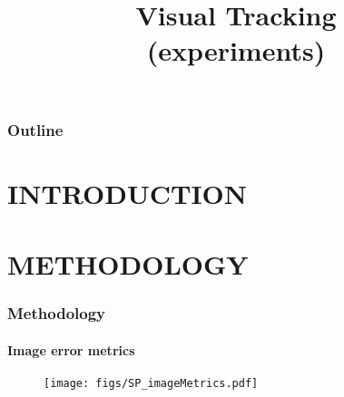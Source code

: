 
\title{Visual Tracking \\ (experiments)}
\begin{frame}[plain]\logoTechTower
	\titlepage
\end{frame}

\begin{frame}
\frametitle{Outline}
\logoCSIPCPL\logoTechTower
	\setcounter{tocdepth}{1}	
	\tableofcontents
\end{frame}

\section{INTRODUCTION}


\section{METHODOLOGY}









\begin{frame}
\frametitle{Methodology}
\framesubtitle{Image error metrics}
\mypagenum
	\begin{figure}
		\texttt{[image: figs/SP\_imageMetrics.pdf]}
	\end{figure}
\end{frame}



